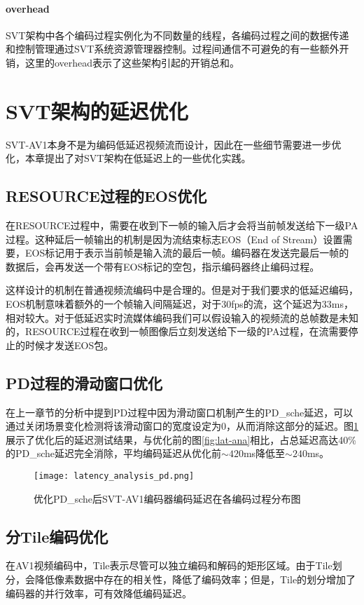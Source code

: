 \paragraph{overhead} SVT架构中各个编码过程实例化为不同数量的线程，各编码过程之间的数据传递和控制管理通过SVT系统资源管理器控制。过程间通信不可避免的有一些额外开销，这里的overhead表示了这些架构引起的开销总和。

\section{SVT架构的延迟优化}

SVT-AV1本身不是为编码低延迟视频流而设计，因此在一些细节需要进一步优化，本章提出了对SVT架构在低延迟上的一些优化实践。

\subsection{RESOURCE过程的EOS优化}
  在RESOURCE过程中，需要在收到下一帧的输入后才会将当前帧发送给下一级PA过程。这种延后一帧输出的机制是因为流结束标志EOS（End of Stream）设置需要，EOS标记用于表示当前帧是输入流的最后一帧。编码器在发送完最后一帧的数据后，会再发送一个带有EOS标记的空包，指示编码器终止编码过程。

  这样设计的机制在普通视频流编码中是合理的。但是对于我们要求的低延迟编码，EOS机制意味着额外的一个帧输入间隔延迟，对于30fps的流，这个延迟为33ms，相对较大。对于低延迟实时流媒体编码我们可以假设输入的视频流的总帧数是未知的，RESOURCE过程在收到一帧图像后立刻发送给下一级的PA过程，在流需要停止的时候才发送EOS包。

\subsection{PD过程的滑动窗口优化}
	在上一章节的分析中提到PD过程中因为滑动窗口机制产生的PD\_sche延迟，可以通过关闭场景变化检测将该滑动窗口的宽度设定为0，从而消除这部分的延迟。图\ref{fig:lat-ana-pd}展示了优化后的延迟测试结果，与优化前的图\ref{fig:lat-ana}相比，占总延迟高达40\%的PD\_sche延迟完全消除，平均编码延迟从优化前$\sim 420$ms降低至$\sim 240$ms。

	\begin{figure}[!htp]
		\centering
		\texttt{[image: latency\_analysis\_pd.png]}
		\caption{优化PD\_sche后SVT-AV1编码器编码延迟在各编码过程分布图}
		\label{fig:lat-ana-pd}
	\end{figure}

\subsection{分Tile编码优化}
	在AV1视频编码中，Tile\cite{a.fuldsethfuldsethTiles}表示尽管可以独立编码和解码的矩形区域。由于Tile划分，会降低像素数据中存在的相关性，降低了编码效率；但是，Tile的划分增加了编码器的并行效率，可有效降低编码延迟\cite{misraOverviewTilesHEVC2013}。

